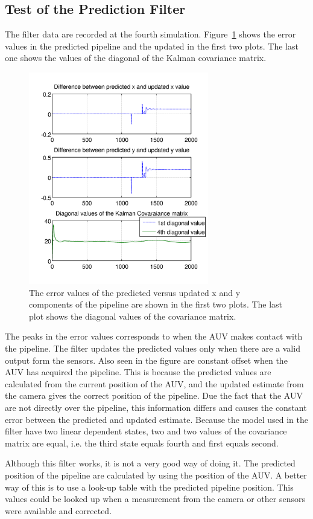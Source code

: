 	\subsection{Test of the Prediction Filter}
		The filter data are recorded at the fourth simulation. Figure~\ref{fig:ch3_4th_filter} shows
		the error values in the predicted pipeline and the updated in the first two plots. The last
		one shows the values of the diagonal of the Kalman covariance matrix. 		
		\begin{figure}[htbp]
			\centering
			\includegraphics[width=0.70\textwidth]{pics/4th_filter}
			\caption[Filter Test]{The error values of the predicted versus updated x and y
			components of the pipeline are shown in the first two plots. The last plot shows the
			diagonal values of the covariance matrix.}
			\label{fig:ch3_4th_filter}
		\end{figure}
		
		The peaks in the error values corresponds to when the AUV makes contact with the pipeline.
		The filter updates the predicted values only when there are a valid output form the
		sensors. Also seen in the figure are constant offset when the AUV has acquired the pipeline.
		This is because the predicted values are calculated from the current position of the
		AUV, and the updated estimate from the camera gives the correct position of the pipeline. Due
		the fact that the AUV are not directly over the pipeline, this information differs and causes
		the constant error between the predicted and updated estimate. 
		Because the model used in the filter have two linear dependent states, two and two values of the
		covariance matrix are equal, i.e. the third state equals fourth and first equals second.	

		Although this filter works, it is not a very good way of doing it. The predicted position of
		the pipeline are calculated by using the position of the AUV. A better way of this is to use a
		look-up table with the predicted pipeline position. This values could be looked up when
		a measurement from the camera or other sensors were available and corrected.



